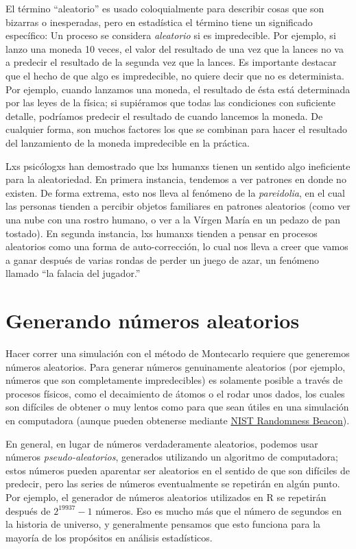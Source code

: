 \documentclass[
  12pt,
]{book}
\begin{document}
El término ``aleatorio'' es usado coloquialmente para describir cosas que son bizarras o inesperadas, pero en estadística el término tiene un significado específico: Un proceso se considera \emph{aleatorio} si es impredecible. Por ejemplo, si lanzo una moneda 10 veces, el valor del resultado de una vez que la lances no va a predecir el resultado de la segunda vez que la lances. Es importante destacar que el hecho de que algo es impredecible, no quiere decir que no es determinista. Por ejemplo, cuando lanzamos una moneda, el resultado de ésta está determinada por las leyes de la física; si supiéramos que todas las condiciones con suficiente detalle, podríamos predecir el resultado de cuando lancemos la moneda. De cualquier forma, son muchos factores los que se combinan para hacer el resultado del lanzamiento de la moneda impredecible en la práctica.

Lxs psicólogxs han demostrado que lxs humanxs tienen un sentido algo ineficiente para la aleatoriedad. En primera instancia, tendemos a ver patrones en donde no existen. De forma extrema, esto nos lleva al fenómeno de la \emph{pareidolia}, en el cual las personas tienden a percibir objetos familiares en patrones aleatorios (como ver una nube con una rostro humano, o ver a la Vírgen María en un pedazo de pan tostado). En segunda instancia, lxs humanxs tienden a pensar en procesos aleatorios como una forma de auto-corrección, lo cual nos lleva a creer que vamos a ganar después de varias rondas de perder un juego de azar, un fenómeno llamado ``la falacia del jugador.''

\hypertarget{generando-nuxfameros-aleatorios}{%
\section{Generando números aleatorios}\label{generando-nuxfameros-aleatorios}}

Hacer correr una simulación con el método de Montecarlo requiere que generemos números aleatorios. Para generar números genuinamente aleatorios (por ejemplo, números que son completamente impredecibles) es solamente posible a través de procesos físicos, como el decaimiento de átomos o el rodar unos dados, los cuales son difíciles de obtener o muy lentos como para que sean útiles en una simulación en computadora (aunque pueden obtenerse mediante \href{https://www.nist.gov/programs-projects/nist-randomness-beacon\%5D}{NIST Randomness Beacon}).

En general, en lugar de números verdaderamente aleatorios, podemos usar números \emph{pseudo-aleatorios}, generados utilizando un algoritmo de computadora; estos números pueden aparentar ser aleatorios en el sentido de que son difíciles de predecir, pero las series de números eventualmente se repetirán en algún punto. Por ejemplo, el generador de números aleatorios utilizados en R se repetirán después de \(2^{19937} - 1\) números. Eso es mucho más que el número de segundos en la historia de universo, y generalmente pensamos que esto funciona para la mayoría de los propósitos en análisis estadísticos.
\end{document}
